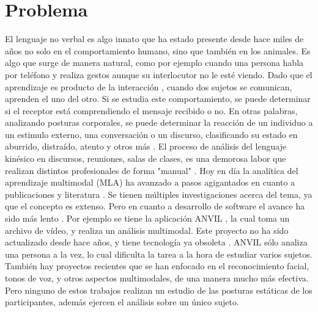 \section{Problema}
El lenguaje no verbal es algo innato que ha estado presente desde hace miles de a\~nos no solo en el comportamiento humano, sino que tambi\'en en los animales. Es algo que surge de manera natural, como por ejemplo cuando una persona habla por tel\'efono y realiza gestos aunque su interlocutor no le est\'e viendo. 
Dado que el aprendizaje es producto de la interacci\'on \cite{ref3}, cuando dos sujetos se comunican, aprenden el uno del otro. Si se estudia este comportamiento, se puede determinar si el receptor est\'a comprendiendo el mensaje recibido o no.
En otras palabras, analizando posturas corporales, se puede determinar la reacci\'on de un individuo a un estimulo externo, una conversaci\'on o un discurso, clasificando su estado en aburrido, distra\'ido, atento y otros m\'as \cite{ref13}.
El proceso de an\'alisis del lenguaje kin\'esico en discursos, reuniones, salas de clases, es una demorosa labor que realizan distintos profesionales de forma "manual" \cite{ref10}. Hoy en d\'ia la anal\'itica del aprendizaje multimodal (MLA) ha avanzado a pasos agigantados en cuanto a publicaciones y literatura \cite{ref2}. Se tienen m\'ultiples investigaciones acerca del tema, ya que el concepto es extenso. Pero en cuanto a desarrollo de software el avance ha sido m\'as lento \cite{ref2}. Por ejemplo se tiene la aplicaci\'on ANVIL \cite{ref11}, la cual toma un archivo de v\'ideo, y realiza un an\'alisis multimodal. Este proyecto no ha sido actualizado desde hace a\~nos, y tiene tecnolog\'ia ya obsoleta \cite{ref2}. ANVIL s\'olo analiza una persona a la vez, lo cual dificulta la tarea a la hora de estudiar varios sujetos. Tambi\'en hay proyectos recientes que se han enfocado en el reconocimiento facial, tonos de voz, y otros aspectos multimodales, de una manera mucho m\'as efectiva. Pero ninguno de estos trabajos realizan un estudio de las posturas est\'aticas de los participantes, adem\'as ejercen el an\'alisis sobre un \'unico sujeto.


